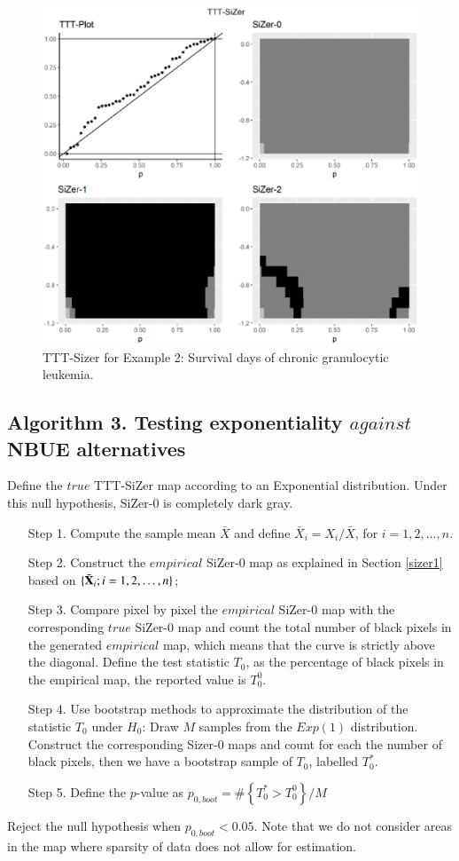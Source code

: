 \documentclass[preprint,12pt]{elsarticle}
\begin{document}
\begin{figure}[htb]
\begin{center}
\includegraphics[height= 0.7\textwidth]{granulocytiQuadraticPuntual_log10.EPS}
\caption{TTT-Sizer for Example 2: Survival days of chronic granulocytic leukemia.}\label{Fig:granu}
\end{center}
\end{figure}
%

\subsection*{Algorithm 3. Testing exponentiality $against$ NBUE alternatives} 
Define the $true$ TTT-SiZer map according to an Exponential distribution. Under this null hypothesis, SiZer-0 is completely dark gray. 
\begin{enumerate}
\item[Step 1.] Compute the sample mean $\bar{X}$ and define $\bar{X}_i=X_i/\bar{X}$, for $ i=1,2,\ldots,n$.
\item[Step 2.] Construct the  $empirical$ SiZer-$0$ map as explained in Section \ref{sizer1} based on  $\{\bar{\bf X}_i; i=1, 2,\ldots, n \}$;
\item[Step 3.] Compare pixel by pixel the $empirical$ SiZer-$0$ map with the corresponding $true$ SiZer-$0$ map and count the total number of black pixels in the generated $empirical$ map, which means that the curve is strictly above the diagonal. Define the test statistic $T_0$, as the percentage of black pixels in the empirical map, the reported value is $T_0^0$.

\item[Step 4.] Use bootstrap methods to approximate the distribution of the statistic $T_0$ under $H_0$: Draw $M$ samples from the $Exp(1)$ distribution. Construct the corresponding Sizer-$0$ maps and count for each the number of black pixels, then we have a bootstrap sample of $T_0$, labelled $T^*_0$.

\item[Step 5.] Define the $p$-value as $p_{0,boot}=\#\left\{T^*_0 > T_0^0\right\}/M$
\end{enumerate}
Reject the null hypothesis when $p_{0,boot} < 0.05$. Note that we do not consider areas in the map where sparsity of data does not allow for estimation. 
\end{document}
